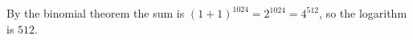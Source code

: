 By the binomial theorem the sum is $(1+1)^{1024}=2^{1024}=4^{512}$, so the logarithm is $\boxed{512}$.
